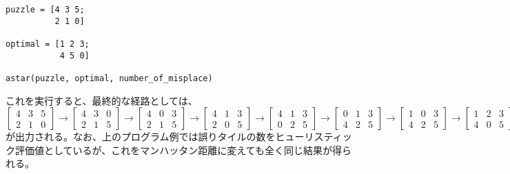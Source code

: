\documentclass[10pt,a4paper]{ltjsarticle}       %
\begin{document}
\begin{lstlisting}
puzzle = [4 3 5;
          2 1 0]

optimal = [1 2 3;
           4 5 0]

astar(puzzle, optimal, number_of_misplace)
\end{lstlisting}
これを実行すると、最終的な経路としては、
\begin{equation*}
\left[
\begin{matrix}
  4 & 3 & 5\\
  2 & 1 & 0
\end{matrix}
\right] \rightarrow \left[
\begin{matrix}
  4 & 3 & 0\\
  2 & 1 & 5
\end{matrix}
\right] \rightarrow \left[
\begin{matrix}
  4 & 0 & 3\\
  2 & 1 & 5
\end{matrix}
\right] \rightarrow 
\left[
\begin{matrix}
  4 & 1 & 3\\
  2 & 0 & 5    
\end{matrix}
\right] \rightarrow \left[
\begin{matrix}
  4 & 1 & 3\\
  0 & 2 & 5
\end{matrix}
\right] \rightarrow \left[
\begin{matrix}
  0 & 1 & 3\\
  4 & 2 & 5
\end{matrix}
\right] \rightarrow 
\left[
\begin{matrix}
  1 & 0 & 3\\
  4 & 2 & 5
\end{matrix}
\right] \rightarrow \left[
\begin{matrix}
  1 & 2 & 3\\
  4 & 0 & 5
\end{matrix}
\right] \rightarrow \left[
\begin{matrix}
  1 & 2 & 3\\
  4 & 5 & 0
\end{matrix}
\right]
\end{equation*}
が出力される。なお、上のプログラム例では誤りタイルの数をヒューリスティック評価値としているが、これをマンハッタン距離に変えても全く同じ結果が得られる。
\end{document}
